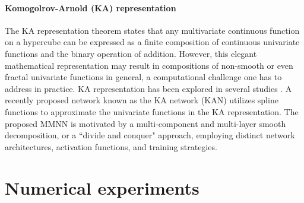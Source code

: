 \documentclass[review,hidelinks,onefignum,onetabnum]{siamart250211}
\begin{document}
\paragraph{Komogolrov-Arnold (KA) representation} 
The KA representation theorem \cite{kolmogorov1957} states that any multivariate continuous function on a hypercube can be expressed as a finite composition of continuous univariate functions and the binary operation of addition. However, this elegant mathematical representation may result in compositions of non-smooth or even fractal univariate functions in general, a computational challenge one has to address in practice. 
KA representation has been explored in several studies \cite{2024arXiv240419756L,MAIOROV199981,shijun:arbitrary:error:with:fixed:size,ISMAYILOVA2024106333}. A recently proposed network known as the KA network (KAN) utilizes spline functions to approximate the univariate functions in the KA representation. The proposed MMNN is motivated by a multi-component and multi-layer smooth decomposition, or a ``divide and conquer" approach, employing distinct network architectures, activation functions, and training strategies.



\section{Numerical experiments}
\label{sec:experiments}
\end{document}

